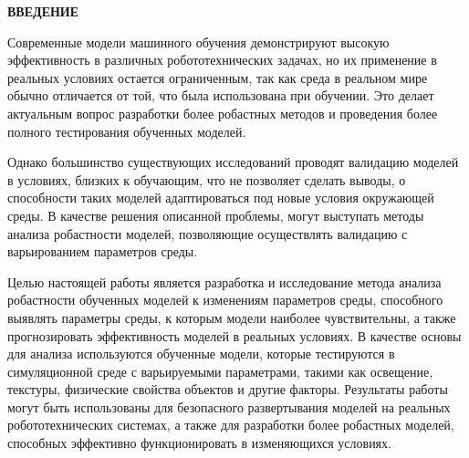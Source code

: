 \newpage
\renewcommand{\contentsname}{\centerline{\large СОДЕРЖАНИЕ}}
\tableofcontents

\newpage
\begin{center}
  \textbf{\large ВВЕДЕНИЕ}
\end{center}

Современные модели машинного обучения демонстрируют высокую эффективность в различных робототехнических задачах, 
но их применение в реальных условиях остается ограниченным, так как среда в реальном мире обычно отличается от той, 
что была использована при обучении. Это делает актуальным вопрос разработки более робастных методов и проведения более полного тестирования обученных моделей.

Однако большинство существующих исследований проводят валидацию моделей в условиях, близких к обучающим, 
что не позволяет сделать выводы, о способности таких моделей адаптироваться под новые условия окружающей среды. 
В качестве решения описанной проблемы, могут выступать методы анализа робастности моделей, позволяющие осуществлять валидацию с варьированием параметров среды.

Целью настоящей работы является разработка и исследование метода анализа робастности обученных моделей к изменениям параметров среды, 
способного выявлять параметры среды, к которым модели наиболее чувствительны, а также прогнозировать эффективность моделей в реальных условиях. В качестве основы для анализа используются обученные модели, 
которые тестируются в симуляционной среде с варьируемыми параметрами, такими как освещение, текстуры, физические свойства объектов и другие факторы.
Результаты работы могут быть использованы для безопасного развертывания моделей на реальных робототехнических системах, а также для разработки более робастных моделей, способных эффективно функционировать в изменяющихся условиях.